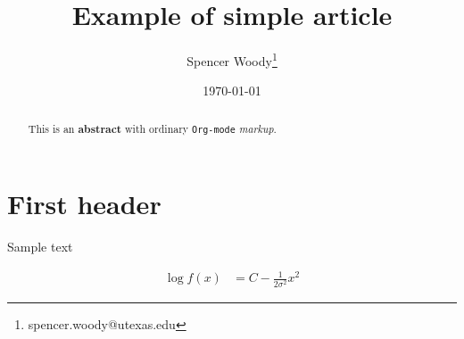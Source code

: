 \documentclass[letter,10pt]{article}
\author{Spencer Woody\thanks{spencer.woody@utexas.edu}}
\date{\today}
\title{Example of simple article}
\begin{document}
\maketitle
\begin{abstract}
This is an \textbf{abstract} with ordinary \texttt{Org-mode} \emph{markup}.
\end{abstract}

\section{First header}
\label{sec-1}

Sample text

\begin{align}
\log f(x) &= C - \frac{1}{2\sigma^2} x^2
\end{align}
\end{document}
